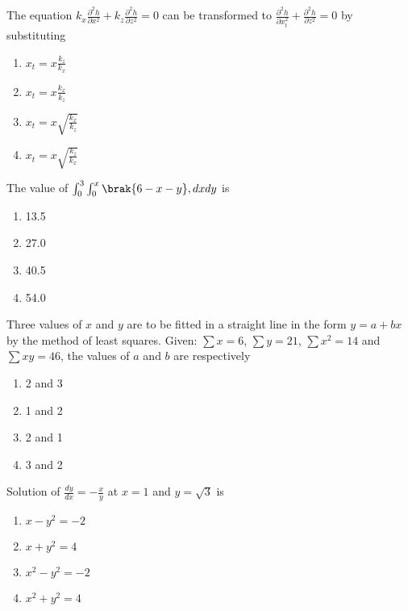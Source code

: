 \item The equation $k_x \frac{\partial^2 h}{\partial x^2} + k_z \frac{\partial^2 h}{\partial z^2} = 0$ can be transformed to $\frac{\partial^2 h}{\partial x_{t}^2} + \frac{\partial^2 h}{\partial z^2} = 0$ by substituting
\begin{multicols}{2}
    \begin{enumerate}
        \item $x_t = x \frac{k_z}{k_x}$
        \item $x_t = x \frac{k_x}{k_z}$
        \item $x_t = x \sqrt{\frac{k_x}{k_z}}$
        \item $x_t = x \sqrt{\frac{k_z}{k_x}}$
    \end{enumerate}
\end{multicols}

\item The value of $\int_0^3 \int_0^x \brak{6-x-y}, dx dy$ is
\begin{multicols}{2}
    \begin{enumerate}
        \item 13.5
        \item 27.0
        \item 40.5
        \item 54.0
    \end{enumerate}
\end{multicols}

\item Three values of $x$ and $y$ are to be fitted in a straight line in the form $y = a + bx$ by the method of least squares. Given: $\sum x = 6$, $\sum y = 21$, $\sum x^2 = 14$ and $\sum xy = 46$, the values of $a$ and $b$ are respectively
\begin{multicols}{2}
    \begin{enumerate}
        \item 2 and 3
        \item 1 and 2
        \item 2 and 1
        \item 3 and 2
    \end{enumerate}
\end{multicols}

\item Solution of $\frac{dy}{dx} = -\frac{x}{y}$ at $x=1$ and $y=\sqrt{3}$ is
\begin{multicols}{2}
    \begin{enumerate}
        \item $x-y^2 = -2$
        \item $x + y^2 = 4$
        \item $x^2 - y^2 = -2$
        \item $x^2 + y^2 = 4$
    \end{enumerate}
\end{multicols}

